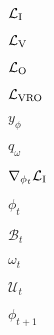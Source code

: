 $\mathcal{L}_{\rm I}$

$\mathcal{L}_{\rm V}$

$\mathcal{L}_{\rm O}$

$\mathcal{L}_{\rm VRO}$

$y_\phi$

$q_\omega$

$\nabla_{\phi_t}\mathcal{L}_{\rm I}$

$\phi_t$

$\mathcal{B}_t$

$\omega_t$

$\mathcal{U}_t$

$\phi_{t+1}$
